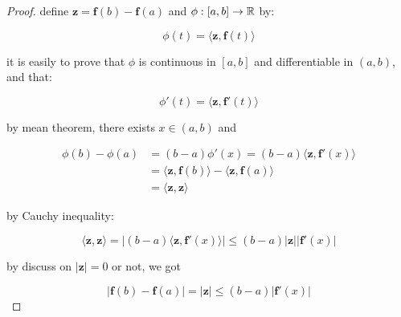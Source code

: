 \begin{proof}
    define $\mathbf{z} = \mathbf{f}(b) - \mathbf{f}(a)$ and $\phi: [a,b] \to \mathbb{R}$ by:

    \[
        \phi(t) = \langle \mathbf{z}, \mathbf{f}(t) \rangle
    \]

    it is easily to prove that $\phi$ is continuous in $[a,b]$ and differentiable in $(a,b)$, and that:

    \[
        \phi'(t) = \langle \mathbf{z}, \mathbf{f}'(t) \rangle
    \]
    
    by mean theorem,
    there exists $x \in (a,b)$ and

    \begin{align*}
        \phi(b) - \phi(a) &= (b-a)\phi'(x) =(b-a)\langle \mathbf{z}, \mathbf{f}'(x) \rangle \\
        &= \langle \mathbf{z}, \mathbf{f}(b) \rangle - \langle \mathbf{z}, \mathbf{f}(a) \rangle \\
        &= \langle \mathbf{z}, \mathbf{z} \rangle 
    \end{align*}

    by Cauchy inequality:

    \[
        \langle \mathbf{z}, \mathbf{z} \rangle = \left| (b-a)\langle \mathbf{z}, \mathbf{f}'(x) \rangle \right| \le (b-a) \lvert \mathbf{z} \rvert  \lvert \mathbf{f}'(x) \rvert
    \]

    by discuss on $\lvert \mathbf{z} \rvert = 0$ or not, we got

    \[
        \lvert\mathbf{f}(b) - \mathbf{f}(a) \rvert = \lvert \mathbf{z} \rvert \le (b-a)\lvert \mathbf{f}'(x) \rvert
    \]
\end{proof}